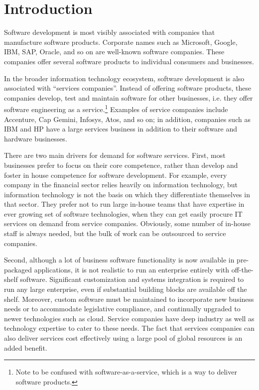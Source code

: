 \section{Introduction}

Software development is most visibly associated with companies that manufacture software products.  Corporate names such as Microsoft, Google, IBM, SAP, Oracle, and so on are well-known software companies.  These companies offer several software  products to individual consumers and businesses.

In the broader information technology ecosystem, software development is also associated with ``services companies''.  Instead of offering software products, these companies develop, test and maintain software for other businesses, i.e. they offer software engineering as a service.\footnote{Note to be confused with software-as-a-service, which is a way to deliver software products.} Examples of service companies include Accenture, Cap Gemini, Infosys, Atos, and so on; in addition, companies such as IBM and HP have a large services business in addition to their software and hardware businesses.

There are two main drivers for demand for software services.  First, most businesses prefer to focus on their core competence, rather than develop and foster in house competence for software development.  For example, every company in the financial sector relies heavily on information technology, but information technology is not the basis on which they differentiate themselves in that sector. They prefer not to run large in-house teams that have expertise in ever growing set of software technologies, when they can get easily procure IT services on demand from service companies. Obviously, some number of in-house staff is always needed, but the bulk of work can be outsourced to service companies.

Second, although a lot of business software functionality is now available in pre-packaged applications, it is not realistic to run an enterprise entirely with off-the-shelf software. Significant customization and systems integration is required to run any large enterprise, even if substantial building blocks are available off the shelf. Moreover, custom software must be maintained to incorporate new business needs or to accommodate legislative compliance, and continually upgraded to newer technologies such as cloud. Service companies have deep industry as well as technology expertise to cater to these needs. The fact that services companies can also deliver services cost effectively using a large pool of global resources is an added benefit. 

